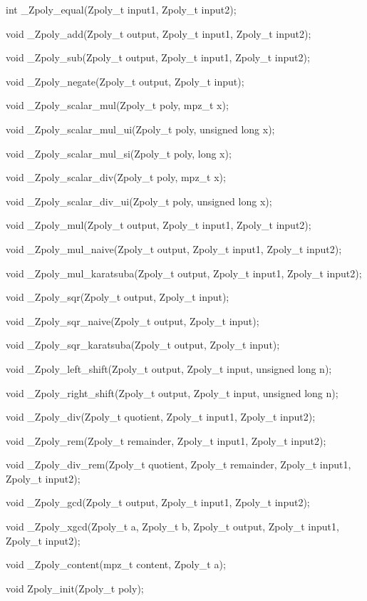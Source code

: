 \documentclass[a4paper,10pt]{article}
\begin{document}
int \_Zpoly\_equal(Zpoly\_t input1, Zpoly\_t input2);

void \_Zpoly\_add(Zpoly\_t output, Zpoly\_t input1, Zpoly\_t input2);

void \_Zpoly\_sub(Zpoly\_t output, Zpoly\_t input1, Zpoly\_t input2);

void \_Zpoly\_negate(Zpoly\_t output, Zpoly\_t input);

void \_Zpoly\_scalar\_mul(Zpoly\_t poly, mpz\_t x);

void \_Zpoly\_scalar\_mul\_ui(Zpoly\_t poly, unsigned long x);

void \_Zpoly\_scalar\_mul\_si(Zpoly\_t poly, long x);

void \_Zpoly\_scalar\_div(Zpoly\_t poly, mpz\_t x);

void \_Zpoly\_scalar\_div\_ui(Zpoly\_t poly, unsigned long x);

void \_Zpoly\_mul(Zpoly\_t output, Zpoly\_t input1, Zpoly\_t input2);

void \_Zpoly\_mul\_naive(Zpoly\_t output, Zpoly\_t input1, Zpoly\_t input2);

void \_Zpoly\_mul\_karatsuba(Zpoly\_t output, Zpoly\_t input1, Zpoly\_t input2);

void \_Zpoly\_sqr(Zpoly\_t output, Zpoly\_t input);

void \_Zpoly\_sqr\_naive(Zpoly\_t output, Zpoly\_t input);

void \_Zpoly\_sqr\_karatsuba(Zpoly\_t output, Zpoly\_t input);

void \_Zpoly\_left\_shift(Zpoly\_t output, Zpoly\_t input, unsigned long n);

void \_Zpoly\_right\_shift(Zpoly\_t output, Zpoly\_t input, unsigned long n);

void \_Zpoly\_div(Zpoly\_t quotient, Zpoly\_t input1, Zpoly\_t input2);

void \_Zpoly\_rem(Zpoly\_t remainder, Zpoly\_t input1, Zpoly\_t input2);

void \_Zpoly\_div\_rem(Zpoly\_t quotient, Zpoly\_t remainder, Zpoly\_t input1, Zpoly\_t input2);

void \_Zpoly\_gcd(Zpoly\_t output, Zpoly\_t input1, Zpoly\_t input2);

void \_Zpoly\_xgcd(Zpoly\_t a, Zpoly\_t b, Zpoly\_t output, Zpoly\_t input1, Zpoly\_t input2);

void \_Zpoly\_content(mpz\_t content, Zpoly\_t a);

\vspace{10mm}

void Zpoly\_init(Zpoly\_t poly);
\end{document}
